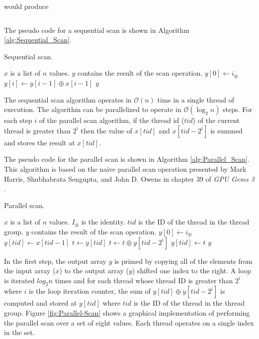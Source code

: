 would produce

\begin{equation}
[0, 2, 3, 5, 8, 12, 20, 33]
\end{equation}

The pseudo code for a sequential scan is shown in Algorithm \ref{alg:Sequential_Scan}.

\begin{algorithm}[h]
\caption{Sequential scan.}
\label{alg:Sequential_Scan}
\begin{algorithmic}[1]
\Require $x$ is a list of $n$ values.
\Ensure $y$ contains the result of the scan operation.
\State $y[0] \gets i_{\oplus}$
\State $y[i] \gets y[i-1]\oplus x[i-1]$
\EndFor
\State \Return $y$
\EndFunction
\end{algorithmic}
\end{algorithm}

The sequential scan algorithm operates in $\mathcal{O}(n)$ time in a single thread of execution. The algorithm can be parallelized to operate in $\mathcal{O}(\log_2 n)$ steps. For each step $i$ of the parallel scan algorithm, if the thread id ($tid$) of the current thread is greater than $2^i$ then the value of $x[tid]$ and $x[tid-2^i]$ is summed and stores the result at $x[tid]$.

The pseudo code for the parallel scan is shown in Algorithm \ref{alg:Parallel_Scan}. This algorithm is based on the naive parallel scan operation presented by Mark Harris, Shubhabrata Sengupta, and John D. Owens in chapter 39 of \emph{GPU Gems 3} \parencite{34_harris_sengupta_owens_2008}. 

\begin{algorithm}[h]
\caption{Parallel scan.}
\label{alg:Parallel_Scan}
\begin{algorithmic}[1]
\Require $x$ is a list of $n$ values.
\Require $I_{\oplus}$ is the identity.
\Require $tid$ is the ID of the thread in the thread group.
\Ensure $y$ contains the result of the scan operation.
\State $y[0] \gets i_{\oplus}$
\Else
\State $y[tid] \gets x[tid-1]$
\EndIf
{}
\State $t \gets y[tid]$
\State $t \gets t \oplus y[tid-2^i]$
\EndIf
\State $y[tid] \gets t$
\EndFor
\State \Return $y$
\EndFunction
\end{algorithmic}
\end{algorithm}

In the first step, the output array $y$ is primed by copying all of the elements from the input array ($x$) to the output array ($y$) shifted one index to the right. A loop is iterated $log_2{n}$ times and for each thread whose thread ID is greater than $2^i$ where $i$ is the loop iteration counter, the sum of $y[tid] \oplus y[tid-2^i]$ is computed and stored at $y[tid]$ where $tid$ is the ID of the thread in the thread group. Figure \ref{fig:Parallel-Scan} shows a graphical implementation of performing the parallel scan over a set of eight values. Each thread operates on a single index in the set.

